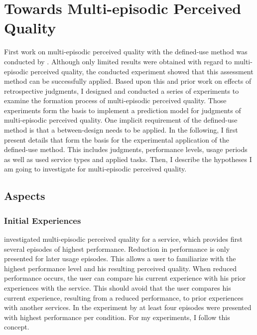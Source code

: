 \chapter{Towards Multi-episodic Perceived Quality}\label{chap:towards}
First work on multi-episodic perceived quality with the  defined-use method was conducted by \citet{moller_single-call_2011}.
Although only limited results were obtained with regard to multi-episodic perceived quality, the conducted experiment showed that this assessment method can be successfully applied.
Based upon this and prior work on effects of retrospective judgments, I designed and conducted a series of experiments to examine the formation process of multi-episodic perceived quality. 
Those experiments form the basis to implement a prediction model for judgments of multi-episodic perceived quality.
One implicit requirement of the defined-use method is that a between-design needs to be applied.
In the following, I first present details that form the basis for the experimental application of the defined-use method.
This includes judgments, performance levels, usage periods as well as used service types and applied tasks.
Then, I describe the hypotheses I am going to investigate for multi-episodic perceived quality.

\section{Aspects}

\subsection{Initial Experiences}
\citet{moller_single-call_2011} investigated multi-episodic perceived quality for a service, which provides first several episodes of highest performance.
Reduction in performance is only presented for later usage episodes.
This allows a user to familiarize with the highest performance level and his resulting perceived quality.
When reduced performance occurs, the user can compare his current experience with his prior experiences with the service.
This should avoid that the user compares his current experience, resulting from a reduced performance, to prior experiences with another services.
In the experiment by \citet{moller_single-call_2011} at least four episodes were presented with highest performance per condition.
For my experiments, I follow this concept.

